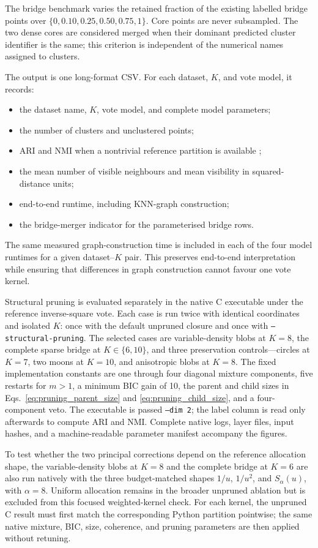 \documentclass[review,12pt]{elsarticle}
\begin{document}
The bridge benchmark varies the retained fraction of the existing labelled bridge points over $\{0,0.10,0.25,0.50,0.75,1\}$. Core points are never subsampled. The two dense cores are considered merged when their dominant predicted cluster identifier is the same; this criterion is independent of the numerical names assigned to clusters.

The output is one long-format CSV. For each dataset, $K$, and vote model, it records:
\begin{itemize}
    \item the dataset name, $K$, vote model, and complete model parameters;
    \item the number of clusters and unclustered points;
    \item ARI and NMI when a nontrivial reference partition is available \citep{HubertArabie1985,VinhEppsBailey2010};
    \item the mean number of visible neighbours and mean visibility in squared-distance units;
    \item end-to-end runtime, including KNN-graph construction;
    \item the bridge-merger indicator for the parameterised bridge rows.
\end{itemize}
The same measured graph-construction time is included in each of the four model runtimes for a given dataset--$K$ pair. This preserves end-to-end interpretation while ensuring that differences in graph construction cannot favour one vote kernel.

Structural pruning is evaluated separately in the native C executable under
the reference inverse-square vote.  Each case is run twice with identical
coordinates and isolated $K$: once with the default unpruned closure and once
with \texttt{--structural-pruning}.  The selected cases are variable-density
blobs at $K=8$, the complete sparse bridge at $K\in\{6,10\}$, and three
preservation controls---circles at $K=7$, two moons at $K=10$, and anisotropic
blobs at $K=8$.  The fixed implementation constants are one through four
diagonal mixture components, five restarts for $m>1$, a minimum BIC gain of
10, the parent and child sizes in Eqs.~\eqref{eq:pruning_parent_size} and
\eqref{eq:pruning_child_size}, and a four-component veto.  The executable is
passed \texttt{--dim 2}; the label column is read only afterwards to compute
ARI and NMI.  Complete native logs, layer files, input hashes, and a
machine-readable parameter manifest accompany the figures.

To test whether the two principal corrections depend on the reference allocation shape,
the variable-density blobs at $K=8$ and the complete bridge at $K=6$ are also
run natively with the three budget-matched shapes $1/u$, $1/u^2$, and
$S_\alpha(u)$, with $\alpha=8$.  Uniform allocation remains in the broader
unpruned ablation but is excluded from this focused weighted-kernel check.  For
each kernel, the unpruned C result must first match the corresponding Python
partition pointwise; the same native mixture, BIC, size, coherence, and pruning
parameters are then applied without retuning.
\end{document}
